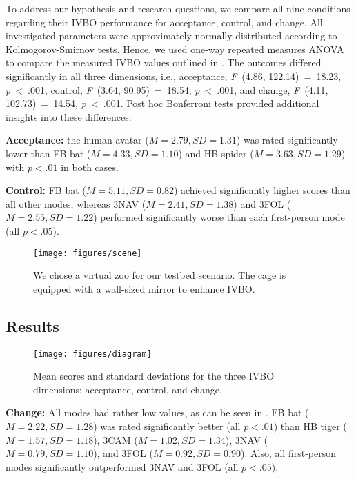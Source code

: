\documentclass[conference]{IEEEtran}
\begin{document}
To address our hypothesis and research questions, we compare all nine conditions regarding their IVBO performance for acceptance, control, and change. All investigated parameters were approximately normally distributed according to Kolmogorov-Smirnov tests. Hence, we used one-way repeated measures ANOVA to compare the measured IVBO  values outlined in . The outcomes differed significantly in all three dimensions, i.e., acceptance, \textit{F}~(4.86, 122.14)~=~18.23, \textit{p}~<~.001, control, \textit{F}~(3.64, 90.95)~=~18.54, \textit{p}~<~.001, and change, \textit{F}~(4.11, 102.73)~=~14.54, \textit{p}~<~.001. Post hoc Bonferroni tests provided additional insights into these differences:

\textbf{Acceptance:} the human avatar ($M = 2.79, SD = 1.31$) was rated significantly lower than FB bat ($M = 4.33, SD = 1.10$) and HB spider ($M = 3.63, SD = 1.29$) with $p < .01$ in both cases. 

\textbf{Control:} FB bat ($M = 5.11, SD = 0.82$) achieved significantly higher scores than all other modes, whereas 3NAV ($M = 2.41, SD = 1.38$) and 3FOL ($M = 2.55, SD = 1.22$) performed significantly worse than each first-person mode (all $p < .05$). 

\begin{figure}[b]
\centering
\texttt{[image: figures/scene]}
\caption{We chose a virtual zoo for our testbed scenario. The cage is equipped with a wall-sized mirror to enhance IVBO.}
\label{fig:scene}
\end{figure}

\subsection{Results}

\begin{figure*}[t!]
\centering
\texttt{[image: figures/diagram]}
\caption{Mean scores and standard deviations for the three IVBO dimensions: acceptance, control, and change.}
\label{fig:diagram}
\end{figure*}

\textbf{Change:} All modes had rather low values, as can be seen in . FB bat ($M = 2.22, SD = 1.28$) was rated significantly better (all $p < .01$) than HB tiger ($M = 1.57, SD = 1.18$), 3CAM ($M = 1.02, SD = 1.34$), 3NAV ($M = 0.79, SD = 1.10$), and 3FOL ($M = 0.92, SD = 0.90$). Also, all first-person modes significantly outperformed 3NAV and 3FOL (all $p < .05$).
\end{document}
